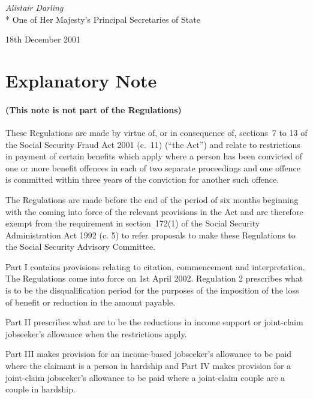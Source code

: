 \documentclass[12pt,a4paper]{article}
\begin{document}
\bigskip


{\raggedleft
\emph{Alistair Darling}\\*
One of Her Majesty's Principal Secretaries of State

}

18th December 2001

\small

\part{Explanatory Note}

\renewcommand\parthead{— Explanatory Note}

\subsection*{(This note is not part of the Regulations)}

These Regulations are made by virtue of, or in consequence of, sections~7 to 13 of the Social Security Fraud Act 2001 (c.~11) (“the Act”) and relate to restrictions in payment of certain benefits which apply where a person has been convicted of one or more benefit offences in each of two separate proceedings and one offence is committed within three years of the conviction for another such offence.

The Regulations are made before the end of the period of six months beginning with the coming into force of the relevant provisions in the Act and are therefore exempt from the requirement in section~172(1) of the Social Security Administration Act 1992 (c. 5) to refer proposals to make these Regulations to the Social Security Advisory Committee.

Part I contains provisions relating to citation, commencement and interpretation. The Regulations come into force on 1st April 2002. Regulation 2 prescribes what is to be the disqualification period for the purposes of the imposition of the loss of benefit or reduction in the amount payable.

Part II prescribes what are to be the reductions in income support or joint-claim jobseeker’s allowance when the restrictions apply.

Part III makes provision for an income-based jobseeker’s allowance to be paid where the claimant is a person in hardship and Part IV makes provision for a joint-claim jobseeker’s allowance to be paid where a joint-claim couple are a couple in hardship.
\end{document}
